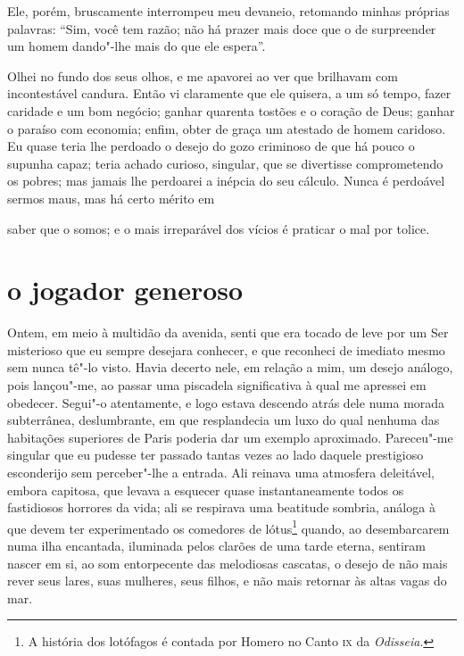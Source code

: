 Ele, porém, bruscamente interrompeu meu devaneio, retomando minhas
próprias palavras: “Sim, você tem razão; não há prazer
mais doce que o de surpreender um homem dando"-lhe mais do que ele
espera''.

Olhei no fundo dos seus olhos, e me apavorei ao ver que
brilhavam com incontestável candura. Então vi claramente que ele
quisera, a um só tempo, fazer caridade e um bom negócio; ganhar quarenta
tostões e o coração de Deus; ganhar o paraíso com economia; enfim,
obter de graça um atestado de homem caridoso. Eu quase teria lhe
perdoado o desejo do gozo criminoso de que há pouco o supunha capaz;
teria achado curioso, singular, que se divertisse comprometendo
os pobres; mas jamais lhe perdoarei a inépcia do seu cálculo. Nunca é
perdoável sermos maus, mas há certo mérito em 

\quebra

\noindent{}saber que o somos; e o
mais irreparável dos vícios é praticar o mal por tolice.

\quebra\section[O jogador generoso]{o jogador generoso}

Ontem, em meio à multidão da avenida, senti que era tocado de leve por
um Ser misterioso que eu sempre desejara conhecer, e que reconheci de
imediato mesmo sem nunca tê"-lo visto. Havia decerto nele, em
relação a mim, um desejo análogo, pois lançou"-me, ao passar uma
piscadela significativa à qual me apressei em obedecer. Segui"-o
atentamente, e logo estava descendo atrás dele numa morada subterrânea,
deslumbrante, em que resplandecia um luxo do qual nenhuma das
habitações superiores de Paris poderia dar um exemplo aproximado.
Pareceu"-me singular que eu pudesse ter passado tantas vezes ao lado
daquele prestigioso esconderijo sem perceber"-lhe a entrada. Ali
reinava uma atmosfera deleitável, embora capitosa, que levava a
esquecer quase instantaneamente todos os fastidiosos horrores da
vida; ali se respirava uma beatitude sombria, análoga à que devem ter
experimentado os comedores de lótus\protect\footnote{  A história 
dos lotófagos é contada por Homero no Canto \textsc{ix} da
\textit{Odisseia}.} quando, ao
desembarcarem numa ilha encantada, iluminada pelos clarões de uma tarde
eterna, sentiram nascer em si, ao som entorpecente das melodiosas
cascatas, o desejo de não mais rever seus lares, suas mulheres, seus
filhos, e não mais retornar às altas vagas do mar.

